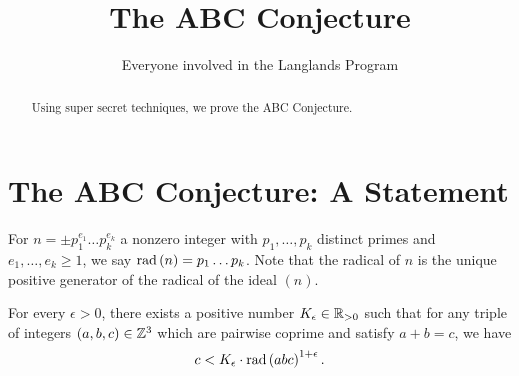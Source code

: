 \documentclass[12pt]{amsart}
\begin{document}
\title{The ABC Conjecture}
\author{Everyone involved in the Langlands Program}

\begin{abstract}
	Using super secret techniques, we prove the ABC Conjecture.
\end{abstract}

\maketitle

\section{The ABC Conjecture: A Statement}

\begin{defn}
	For $n = \pm p_1^{e_1} \ldots p_k^{e_k}$ a nonzero integer with $p_1, \ldots, p_k$ distinct primes and $e_1, \ldots, e_k \geq 1$, we say $\text{\rm{rad}} \left( n \right) = p_1 \ldots p_k$. Note that the radical of $n$ is the unique positive generator of the radical of the ideal $(n)$.
\end{defn}

\begin{conjecture}
	For every $\epsilon > 0$, there exists a positive number $K_\epsilon \in \mathbb{R}_{> 0}$ such that for any triple of integers $(a,b,c) \in \mathbb{Z}^3$ which are pairwise coprime and satisfy $a + b = c$, we have 
	\[
	c < K_\epsilon \cdot \text{\rm{rad}}\left( abc \right)^{1 + \epsilon}.
	\]
\end{conjecture}

{}

\end{document}
